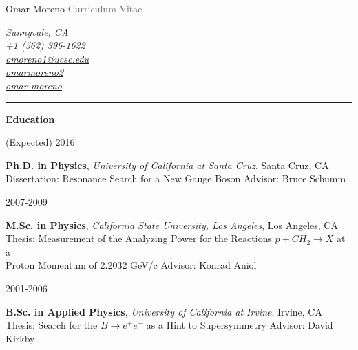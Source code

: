 \documentclass[11pt]{article}
\newcommand{\cvsection}[1] {
    \noindent
    \textcolor{indigodye}{\rule{.15\textwidth}{.1in} \hspace{0.01 \textwidth} \textbf{\Large{#1}}} \newline
}
\newcommand{\educationentry}[6] { 
    \noindent
    \begin{minipage}[t]{0.15\textwidth} \begin{flushright} #1 \end{flushright} \end{minipage} \hspace{0.01\textwidth}
    \begin{minipage}[t]{0.84\textwidth} 
        \textbf{#2}, \emph{#3}, #4 \newline 
        #5 \newline
        Advisor: #6 \newline 
    \end{minipage}
}
\begin{document}
    
    \noindent
    \begin{minipage}[c]{0.5\textwidth}
        \begin{flushleft}
            \Huge{Omar Moreno} \newline
            \Large{\textcolor{dimgray}{Curriculum Vitae}}
        \end{flushleft}
    \end{minipage}
    \begin{minipage}[c]{0.50\textwidth}
        \begin{flushright}
            \color{dimgray} \em
            Sunnyvale, CA           \\
            \faMobilePhone \hspace{1pt} +1 (562) 396-1622       \\
            \faEnvelope \hspace{1pt} \href{mailto:omoreno1@ucsc.edu}{omoreno1@ucsc.edu}          \\
            \faLinkedin \hspace{1pt} \href{https://www.linkedin.com/in/omarmoreno2}{omarmoreno2} \\
            \faGithub \hspace{1pt} \href{https://github.com/omar-moreno}{omar-moreno}            \\
        \end{flushright}
    \end{minipage}

    \cvsection{Education}
        \educationentry{(Expected) 2016}
                       {Ph.D. in Physics}
                       {University of California at Santa Cruz}
                       {Santa Cruz, CA}
                       {Dissertation: Resonance Search for a New Gauge Boson}
                       {Bruce Schumm}
        \educationentry{2007-2009}
                       {M.Sc. in Physics}
                       {California State University, Los Angeles}
                       {Los Angeles, CA}
                       {Thesis: Measurement of the Analyzing Power for the Reactions $p + CH_{2}
                       \rightarrow X$ at a \\ Proton Momentum of 2.2032 GeV/c}
                       {Konrad Aniol} 
        \educationentry{2001-2006}
                       {B.Sc. in Applied Physics}
                       {University of California at Irvine}
                       {Irvine, CA}
                       {Thesis: Search for the $B\rightarrow e^+e^-$ as a Hint to Supersymmetry}
                       {David Kirkby}
\end{document}
